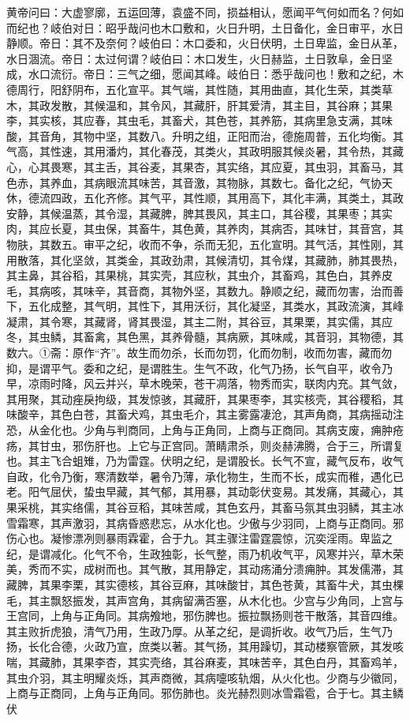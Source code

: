 \documentclass[a4paper,12pt,UTF8,twoside]{ctexbook}
\begin{document}
黄帝问曰：大虚寥廓，五运回薄，袁盛不同，损益相认，愿闻平气何如而名？何如而纪也？岐伯对日：昭乎哉问也木口敷和，火日升明，土日备化，金日审平，水日静顺。帝日：其不及奈何？岐伯曰：木口委和，火日伏明，土日卑监，金日从革，水日涸流。帝日：太过何谓？岐伯曰：木口发生，火日赫监，土日敦阜，金日坚成，水口流衍。帝日：三气之细，愿闻其峰。岐伯日：悉乎哉问也！敷和之纪，木德周行，阳舒阴布，五化宣平。其气端，其性随，其用曲直，其化生荣，其类草木，其政发散，其候温和，其令风，其藏肝，肝其爱清，其主目，其谷麻；其果李，其实核，其应春，其虫毛，其畜犬，其色苍，其养筋，其病里急支满，其味酸，其音角，其物中坚，其数八。升明之组，正阳而治，德施周普，五化均衡。其气高，其性速，其用潘灼，其化春茂，其类火，其政明服其候炎暑，其令热，其藏心，心其畏寒，其主舌，其谷麦，其果杏，其实络，其应夏，其虫羽，其畜马，其色赤，其养血，其病眼流其味苦，其音激，其物脉，其数七。备化之纪，气协天休，德流四政，五化齐修。其气平，其性顺，其用高下，其化丰满，其类土，其政安静，其候温蒸，其令湿，其藏脾，脾其畏风，其主口，其谷稷，其果枣；其实肉，其应长夏，其虫保，其畜牛，其色黄，其养肉，其病否，其味甘，其音宫，其物肤，其数五。审平之纪，收而不争，杀而无犯，五化宣明。其气活，其性刚，其用散落，其化坚敛，其类金，其政劲肃，其候清切，其令煤，其藏肺，肺其畏热，其主鼻，其谷稻，其果桃，其实壳，其应秋，其虫介，其畜鸡，其色白，其养皮毛，其病咳，其味辛，其音商，其物外坚，其数九。静顺之纪，藏而勿害，治而善下，五化成整，其气明，其性下，其用沃衍，其化凝坚，其类水，其政流演，其峰凝肃，其令寒，其藏肾，肾其畏湿，其主二附，其谷豆，其果栗，其实儒，其应冬，其虫鳞，其畜禽，其色黑，其养骨髓，其病厥，其味咸，其音羽，其物德，其数六。①斋：原作“齐”。故生而勿杀，长而勿罚，化而勿制，收而勿害，藏而勿抑，是谓平气。委和之纪，是谓胜生。生气不政，化气乃扬，长气自平，收令乃早，凉雨时降，风云并兴，草木晚荣，苍干凋落，物秀而实，联肉内充。其气敛，其用聚，其动痤戾拘级，其发惊骇，其藏肝，其果枣李，其实核壳，其谷稷稻，其味酸辛，其色白苍，其畜犬鸡，其虫毛介，其主雾露凄沧，其声角商，其病摇动注恐，从金化也。少角与判商同，上角与正角同，上商与正商同。其病支废，痈肿疮疡，其甘虫，邪伤肝也。上它与正宫同。萧睛肃杀，则炎赫沸腾，合于三，所谓复也。其主飞合蛆雉，乃为雷霆。伏明之纪，是谓股长。长气不宣，藏气反布，收气自政，化令乃衡，寒清数举，暑令乃薄，承化物生，生而不长，成实而稚，遇化已老。阳气屈伏，蛰虫早藏，其气郁，其用暴，其动彰伏变易。其发痛，其藏心，其果采桃，其实络儒，其谷豆稻，其味苦咸，其色玄丹，其畜马氛其虫羽鳞，其主冰雪霜寒，其声激羽，其病昏惑悲忘，从水化也。少傲与少羽同，上商与正商同。邪伤心也。凝惨漂冽则暴雨霖霍，合于九。其主骤注雷霆震惊，沉奕淫雨。卑监之纪，是谓减化。化气不令，生政独彰，长气整，雨乃机收气平，风寒并兴，草木荣美，秀而不实，成树而也。其气散，其用静定，其动疡涌分溃痈肿。其发儒滞，其藏脾，其果李栗，其实德核，其谷豆麻，其味酸甘，其色苍黄，其畜牛犬，其虫棵毛，其主飘怒振发，其声宫角，其病留满否塞，从木化也。少宫与少角同，上宫与王宫同，上角与正角同。其病飧地，邪伤脾也。振拉飘扬则苍干散落，其音四维。其主败折虎狼，清气乃用，生政乃厚。从革之纪，是调折收。收气乃后，生气乃扬，长化合德，火政乃宣，庶类以著。其气扬，其用躁切，其动楼察管厥，其发咳喘，其藏肺，其果李杏，其实壳络，其谷麻麦，其味苦辛，其色白丹，其畜鸡羊，其虫介羽，其主明耀炎烁，其声商微，其病嚏咳轨烟，从火化也。少商与少徽同，上商与正商同，上角与正角同。邪伤肺也。炎光赫烈则冰雪霜雹，合于七。其主鳞伏
\end{document}
